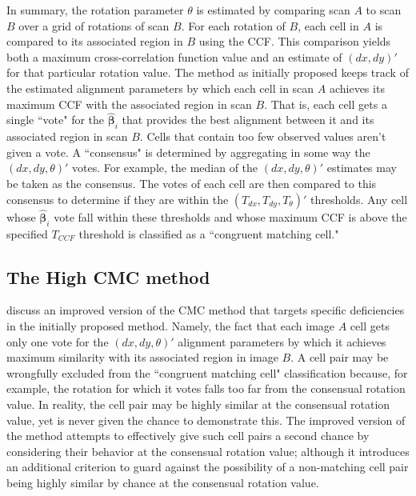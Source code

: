In summary, the rotation parameter $\theta$ is estimated by comparing scan $A$ to scan $B$ over a grid of rotations of scan $B$. For each rotation of $B$, each cell in $A$ is compared to its associated region in $B$ using the CCF. This comparison yields both a maximum cross-correlation function value and an estimate of $(dx,dy)'$ for that particular rotation value. The method as initially proposed keeps track of the estimated alignment parameters by which each cell in scan $A$ achieves its maximum CCF with the associated region in scan $B$. That is, each cell gets a single ``vote" for the $\hat{\pmb{\beta}}_i$ that provides the best alignment between it and its associated region in scan $B$. Cells that contain too few observed values aren't given a vote. A ``consensus" is determined by aggregating in some way the $(dx,dy,\theta)'$ votes. For example, the median of the $(dx,dy,\theta)'$ estimates may be taken as the consensus. The votes of each cell are then compared to this consensus to determine if they are within the $(T_{dx}, T_{dy}, T_\theta)'$ thresholds. Any cell whose $\hat{\pmb{\beta}}_i$ vote fall within these thresholds and whose maximum CCF is above the specified $T_{CCF}$ threshold is classified as a ``congruent matching cell." 

\subsection{The High CMC method} \label{highCMCMethod}

\citet{tong_improved_2015} discuss an improved version of the CMC method that targets specific deficiencies in the initially proposed method. Namely, the fact that each image $A$ cell gets only one vote for the $(dx,dy,\theta)'$ alignment parameters by which it achieves maximum similarity with its associated region in image $B$. A cell pair may be wrongfully excluded from the ``congruent matching cell" classification because, for example, the rotation for which it votes falls too far from the consensual rotation value. In reality, the cell pair may be highly similar at the consensual rotation value, yet is never given the chance to demonstrate this. The improved version of the method attempts to effectively give such cell pairs a second chance by considering their behavior at the consensual rotation value; although it introduces an additional criterion to guard against the possibility of a non-matching cell pair being highly similar by chance at the consensual rotation value.

